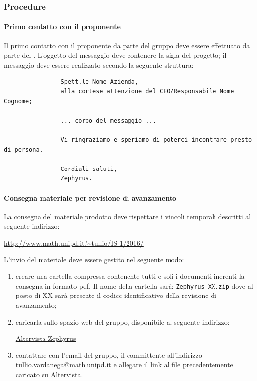 		\subsubsection{Procedure}
			\paragraph{Primo contatto con il proponente}
			Il primo contatto con il proponente da parte del gruppo \zephyrus{} deve essere effettuato da parte del \responsabilediprogetto{}. L'oggetto del messaggio deve contenere la sigla del progetto; il messaggio deve essere realizzato secondo la seguente struttura:
			\bigskip
				\begin{verbatim}
				Spett.le Nome Azienda, 
				alla cortese attenzione del CEO/Responsabile Nome Cognome;
				
				... corpo del messaggio ...
				
				Vi ringraziamo e speriamo di poterci incontrare presto di persona.
				
				Cordiali saluti,
				Zephyrus.
				\end{verbatim}
			\paragraph{Consegna materiale per revisione di avanzamento}
			La consegna del materiale prodotto deve rispettare i vincoli temporali descritti al seguente indirizzo:
			\begin{center}
				\url{http://www.math.unipd.it/~tullio/IS-1/2016/}
			\end{center}
			L'invio del materiale deve essere gestito nel seguente modo:
			\begin{enumerate}
				\item creare una cartella compressa contenente tutti e soli i documenti inerenti la consegna in formato pdf. Il nome della cartella sarà: \texttt{Zephyrus-XX.zip} dove al posto di XX sarà presente il codice identificativo della revisione di avanzamento;
				\item caricarla sullo spazio web del gruppo, disponibile al seguente indirizzo:
				\begin{center}
					\href{http://zephyrusar.altervista.org/}{Altervista Zephyrus}
				\end{center}
			\item contattare con l'email del gruppo, il committente all'indirizzo \url{tullio.vardanega@math.unipd.it} e allegare il link al file precedentemente caricato su Altervista.
			\end{enumerate}
